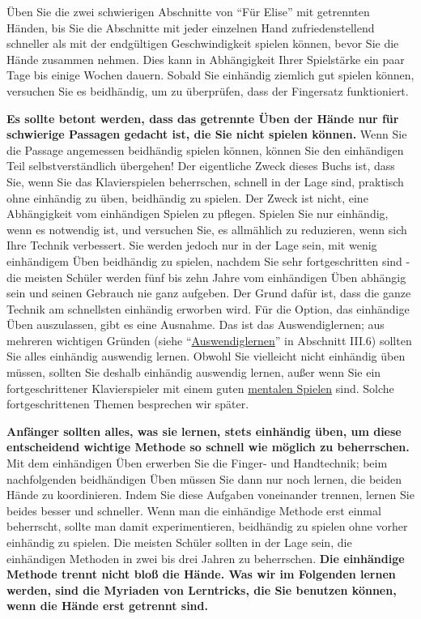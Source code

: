 Üben Sie die zwei schwierigen Abschnitte von \enquote{Für Elise} mit getrennten Händen, bis Sie die Abschnitte mit jeder einzelnen Hand zufriedenstellend schneller als mit der endgültigen Geschwindigkeit spielen können, bevor Sie die Hände zusammen nehmen.
Dies kann in Abhängigkeit Ihrer Spielstärke ein paar Tage bis einige Wochen dauern.
Sobald Sie einhändig ziemlich gut spielen können, versuchen Sie es beidhändig, um zu überprüfen, dass der Fingersatz funktioniert.

\textbf{Es sollte betont werden, dass das getrennte Üben der Hände nur für schwierige Passagen gedacht ist, die Sie nicht spielen können.}
Wenn Sie die Passage angemessen beidhändig spielen können, können Sie den einhändigen Teil selbstverständlich übergehen!
Der eigentliche Zweck dieses Buchs ist, dass Sie, wenn Sie das Klavierspielen beherrschen, schnell in der Lage sind, praktisch ohne einhändig zu üben, beidhändig zu spielen.
Der Zweck ist nicht, eine Abhängigkeit vom einhändigen Spielen zu pflegen.
Spielen Sie nur einhändig, wenn es notwendig ist, und versuchen Sie, es allmählich zu reduzieren, wenn sich Ihre Technik verbessert.
Sie werden jedoch nur in der Lage sein, mit wenig einhändigem Üben beidhändig zu spielen, nachdem Sie sehr fortgeschritten sind - die meisten Schüler werden fünf bis zehn Jahre vom einhändigen Üben abhängig sein und seinen Gebrauch nie ganz aufgeben.
Der Grund dafür ist, dass die ganze Technik am schnellsten einhändig erworben wird.
Für die Option, das einhändige Üben auszulassen, gibt es eine Ausnahme.
Das ist das Auswendiglernen; aus mehreren wichtigen Gründen (siehe \enquote{\hyperref[c1iii6]{Auswendiglernen}} in Abschnitt III.6) sollten Sie alles einhändig auswendig lernen.
Obwohl Sie vielleicht nicht einhändig üben müssen, sollten Sie deshalb einhändig auswendig lernen, außer wenn Sie ein fortgeschrittener Klavierspieler mit einem guten \hyperref[c1ii12mental]{mentalen Spielen} sind.
Solche fortgeschrittenen Themen besprechen wir später.

\textbf{Anfänger sollten alles, was sie lernen, stets einhändig üben, um diese entscheidend wichtige Methode so schnell wie möglich zu beherrschen.}
Mit dem einhändigen Üben erwerben Sie die Finger- und Handtechnik; beim nachfolgenden beidhändigen Üben müssen Sie dann nur noch lernen, die beiden Hände zu koordinieren.
Indem Sie diese Aufgaben voneinander trennen, lernen Sie beides besser und schneller.
Wenn man die einhändige Methode erst einmal beherrscht, sollte man damit experimentieren, beidhändig zu spielen ohne vorher einhändig zu spielen.
Die meisten Schüler sollten in der Lage sein, die einhändigen Methoden in zwei bis drei Jahren zu beherrschen.
\textbf{Die einhändige Methode trennt nicht bloß die Hände.
Was wir im Folgenden lernen werden, sind die Myriaden von Lerntricks, die Sie benutzen können, wenn die Hände erst getrennt sind.}

